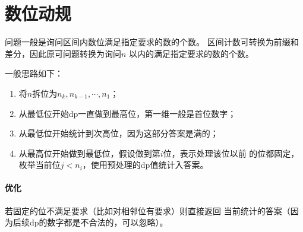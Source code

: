 \section{数位动规}
问题一般是询问区间内数位满足指定要求的数的个数。
区间计数可转换为前缀和差分，因此原可问题转换为询问$n$
以内的满足指定要求的数的个数。

一般思路如下：
\begin{enumerate}
	\item 将$n$拆位为$n_k,n_{k-1},\cdots,n_1$；
	\item 从最低位开始dp一直做到最高位，第一维一般是首位数字；
	\item 从最低位开始统计到次高位，因为这部分答案是满的；
	\item 从最高位开始做到最低位，假设做到第$i$位，表示处理该位以前
	      的位都固定，枚举当前位$j<n_i$，使用预处理的dp值统计入答案。
\end{enumerate}

\paragraph{优化} 若固定的位不满足要求（比如对相邻位有要求）则直接返回
当前统计的答案（因为后续dp的数字都是不合法的，可以忽略）。
